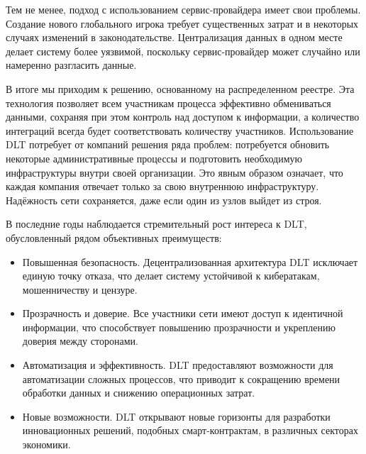 Тем не менее, подход с использованием сервис-провайдера имеет свои проблемы. Создание нового глобального игрока требует существенных затрат и в некоторых случаях изменений в законодательстве. Централизация данных в одном месте делает систему более уязвимой, поскольку сервис-провайдер может случайно или намеренно разгласить данные.

В итоге мы приходим к решению, основанному на распределенном реестре. Эта технология позволяет всем участникам процесса эффективно обмениваться данными, сохраняя при этом контроль над доступом к информации, а количество интеграций всегда будет соответствовать количеству участников. Использование DLT  потребует от компаний решения ряда проблем: потребуется обновить некоторые административные процессы и подготовить необходимую инфраструктуры внутри своей организации. Это явным образом означает, что каждая компания отвечает только за свою внутреннюю инфраструктуру. Надёжность сети сохраняется, даже если один из узлов выйдет из строя.

В последние годы наблюдается стремительный рост интереса к DLT, обусловленный рядом объективных преимуществ:
\begin{itemize}
	\item Повышенная безопасность. Децентрализованная архитектура DLT исключает единую точку отказа, что делает систему устойчивой к кибератакам, мошенничеству и цензуре.

	\item Прозрачность и доверие. Все участники сети имеют доступ к идентичной информации, что способствует повышению прозрачности и укреплению доверия между сторонами.

	\item Автоматизация и эффективность. DLT предоставляют возможности для автоматизации сложных процессов, что приводит к сокращению времени обработки данных и снижению операционных затрат.

	\item Новые возможности. DLT открывают новые горизонты для разработки инновационных решений, подобных смарт-контрактам, в различных секторах экономики.
\end{itemize}

